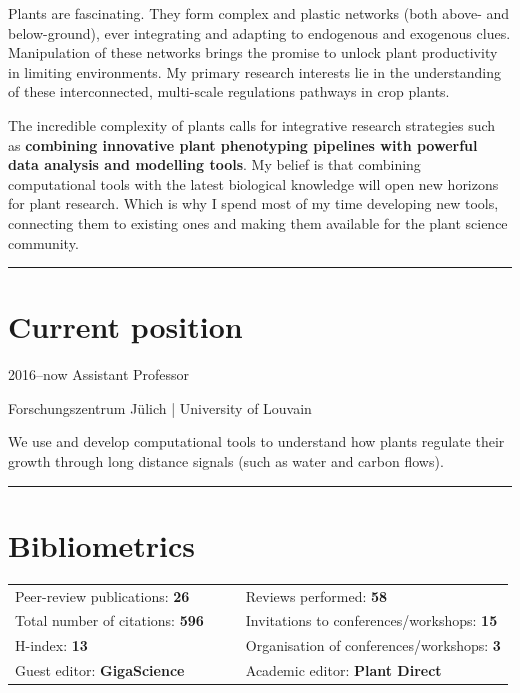 \documentclass[]{friggeri-cv} %
\begin{document}
Plants are fascinating. They form complex and plastic networks (both above- and below-ground), ever integrating and adapting to endogenous and exogenous clues. Manipulation of these networks brings the promise to unlock plant productivity in limiting environments. My primary research interests lie in the understanding of these interconnected, multi-scale regulations pathways in crop plants. 

The incredible complexity of plants calls for integrative research strategies such as \textbf{combining innovative plant phenotyping pipelines with powerful data analysis and modelling tools}. My belief is that combining computational tools with the latest biological knowledge will open new horizons for plant research. Which is why I spend most of my time developing new tools, connecting them to existing ones and making them available for the plant science community.

\rule{\linewidth}{0.5pt}
\section{Current position}

\begin{entrylist}
\entry
{2016--now}
{Assistant Professor}
{}
{Forschungszentrum Jülich | University of Louvain\\
\vspace{2pt}

We use and develop computational tools to understand how plants regulate their growth through long distance signals (such as water and carbon flows).}

\end{entrylist}



\rule{\linewidth}{0.5pt}
\section{Bibliometrics}

\begin{tabular}{lp{0.8cm}|p{0.8cm}l}

    Peer-review publications: \textbf{26} & & &  Reviews performed: \textbf{58}\\
    Total number of citations: \textbf{596} & & & Invitations to conferences/workshops: \textbf{15}\\
    H-index: \textbf{13} & & & Organisation of conferences/workshops: \textbf{3}\\
    Guest editor: \textbf{GigaScience} & & & Academic editor: \textbf{Plant Direct}\\   
\end{tabular}
\vspace{0.3cm}
\end{document}
